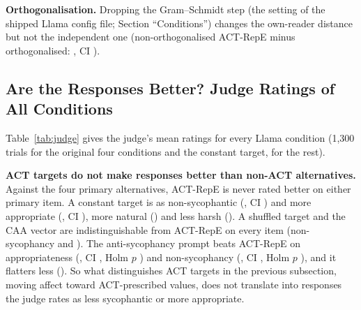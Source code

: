 \documentclass[letterpaper]{article} %
\begin{document}
\textbf{Orthogonalisation.} Dropping the Gram--Schmidt step (the setting of the shipped Llama config file; Section ``Conditions'') changes the own-reader distance but not the independent one (non-orthogonalised ACT-RepE minus orthogonalised: \AblMCrossRepeactnonorthoDelta, CI \AblMCrossRepeactnonorthoCi).

\subsection{Are the Responses Better? Judge Ratings of All Conditions}

Table~\ref{tab:judge} gives the judge's mean ratings for every Llama condition (1,300 trials for the original four conditions and the constant target, \SubsetTrials{} for the rest).

\begin{table}[t]
\centering
\caption{LLM-judge ratings (\JudgeModel) of Llama-3.1-8B responses, 7-point scales: appropriate, natural and non-sycophantic (higher is better; validated against human ratings), plus flatters, gives in and harsh (lower is less of it). $\Delta$ = condition minus ACT-RepE on the same trials; * = $p < 0.05$, cluster bootstrap over scenarios, Holm-corrected within item for the constant target, shuffled target, CAA vector and prompt, uncorrected otherwise.}
\label{tab:judge}
\small

\end{table}

\textbf{ACT targets do not make responses better than non-ACT alternatives.} Against the four primary alternatives, ACT-RepE is never rated better on either primary item. A constant target is as non-sycophantic (\JdLlamaRepeconstVsRepEC, CI \JdLlamaRepeconstVsRepECCi) and more appropriate (\JdLlamaRepeconstVsRepEA, CI \JdLlamaRepeconstVsRepEACi), more natural (\JdLlamaRepeconstVsRepEB) and less harsh (\JdLlamaRepeconstVsRepEG). A shuffled target and the CAA vector are indistinguishable from ACT-RepE on every item (non-sycophancy \JdLlamaRepeshuffledVsRepEC{} and \JdLlamaCaaVsRepEC). The anti-sycophancy prompt beats ACT-RepE on appropriateness (\JdLlamaAntisycpromptVsRepEA, CI \JdLlamaAntisycpromptVsRepEACi, Holm $p$ \JdLlamaAntisycpromptVsRepEAP) and non-sycophancy (\JdLlamaAntisycpromptVsRepEC, CI \JdLlamaAntisycpromptVsRepECCi, Holm $p$ \JdLlamaAntisycpromptVsRepECP), and it flatters less (\JdLlamaAntisycpromptVsRepED). So what distinguishes ACT targets in the previous subsection, moving affect toward ACT-prescribed values, does not translate into responses the judge rates as less sycophantic or more appropriate.
\end{document}
